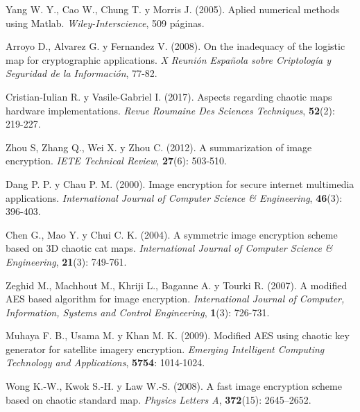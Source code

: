 \begin{thebibliography}{00}
Yang W. Y., Cao W., Chung T. y Morris J. (2005).
\newblock Aplied numerical methods using Matlab.
\newblock \emph{Wiley-Interscience}, 509 páginas.

Arroyo D., Alvarez G. y Fernandez V. (2008).
\newblock On the inadequacy of the logistic map for cryptographic applications.
\newblock \emph{X Reunión Española sobre Criptología y Seguridad de la Información}, 77-82.

Cristian-Iulian R. y Vasile-Gabriel I. (2017).
\newblock Aspects regarding chaotic maps hardware implementations.
\newblock \emph{Revue Roumaine Des Sciences Techniques}, \textbf{52}(2): 219-227.

Zhou S, Zhang Q., Wei X. y Zhou C. (2012).
\newblock A summarization of image encryption.
\newblock \emph{IETE Technical Review}, \textbf{27}(6): 503-510.

Dang P. P. y Chau P. M. (2000).
\newblock Image encryption for secure internet multimedia applications.
\newblock \emph{International Journal of Computer Science \& Engineering}, \textbf{46}(3): 396-403.

Chen G., Mao Y. y Chui C. K. (2004).
\newblock A symmetric image encryption scheme based on 3D chaotic cat maps.
\newblock \emph{International Journal of Computer Science \& Engineering}, \textbf{21}(3): 749-761.

Zeghid M., Machhout M., Khriji L., Baganne A. y Tourki R. (2007).
\newblock A modified AES based algorithm for image encryption.
\newblock \emph{International Journal of Computer, Information, Systems and Control Engineering}, \textbf{1}(3): 726-731.

Muhaya F. B., Usama M. y Khan M. K. (2009).
\newblock Modified AES using chaotic key generator for satellite imagery encryption.
\newblock \emph{Emerging Intelligent Computing Technology and Applications}, \textbf{5754}: 1014-1024.

Wong K.-W., Kwok S.-H. y Law W.-S. (2008).
\newblock A fast image encryption scheme based on chaotic standard map.
\newblock \emph{Physics Letters A}, \textbf{372}(15): 2645–2652.


\end{thebibliography}
